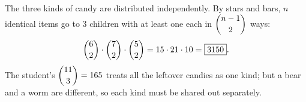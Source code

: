 The three kinds of candy are distributed independently. By stars and bars, $n$ identical items go to $3$ children with at least one each in $\dbinom{n-1}{2}$ ways:
\[
\dbinom62\cdot\dbinom72\cdot\dbinom52=15\cdot21\cdot10=\boxed{3150}.
\]
The student's $\dbinom{11}{3}=165$ treats all the leftover candies as one kind; but a bear and a worm are different, so each kind must be shared out separately.
